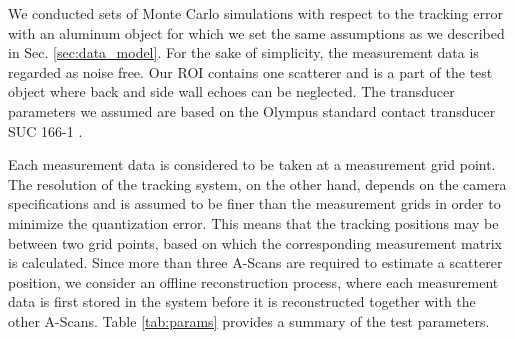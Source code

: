 We conducted sets of Monte Carlo simulations with respect to the tracking error with an aluminum object for which we set the same assumptions as we described in Sec. \ref{sec:data_model}. For the sake of simplicity, the measurement data is regarded as noise free. Our ROI contains one scatterer and is a part of the test object where back and side wall echoes can be neglected. The transducer parameters we assumed are based on the Olympus standard contact transducer SUC 166-1 \cite{OlympusCatalog}. \par

Each measurement data is considered to be taken at a measurement grid point. The resolution of the tracking system, on the other hand, depends on the camera specifications and is assumed to be finer than the measurement grids in order to minimize the quantization error. This means that the tracking positions may be between two grid points, based on which the corresponding measurement matrix is calculated. Since more than three A-Scans are required to estimate a scatterer position, we consider an offline reconstruction process, where each measurement data is first stored in the system before it is reconstructed together with the other A-Scans. Table \ref{tab:params} provides a summary of the test parameters. \par

\setlength{\belowcaptionskip}{-10pt} %
